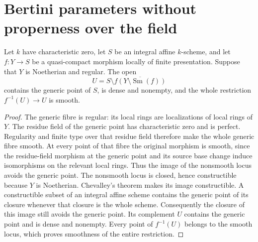 \section{Bertini parameters without properness over the field}
\label{sec:kn-relative-nadel-bertini}

\begin{lemma}
\label{lem:kn-relative-nadel-bertini-good-open}
\leanok
{}
Let $k$ have characteristic zero, let $S$ be an integral affine $k$-scheme,
and let $f:Y\to S$ be a quasi-compact morphism locally of finite presentation.
Suppose that $Y$ is Noetherian and regular.  The open
\[
 U=S\setminus\overline{f(Y\setminus\operatorname{Sm}(f))}
\]
contains the generic point of $S$, is dense and nonempty, and the whole
restriction $f^{-1}(U)\to U$ is smooth.
\end{lemma}
\begin{proof}
The generic fibre is regular: its local rings are localizations of local
rings of $Y$.  The residue field of the generic point has characteristic
zero and is perfect.  Regularity and finite type over that residue field
therefore make the whole generic fibre smooth.  At every point of that
fibre the original morphism is smooth, since the residue-field morphism
at the generic point and its source base change induce isomorphisms on
the relevant local rings.  Thus the image of the nonsmooth locus avoids
the generic point.  The nonsmooth locus is closed, hence constructible
because $Y$ is Noetherian.  Chevalley's theorem makes its image
constructible.  A constructible subset of an integral affine scheme
contains the generic point of its closure whenever that closure is the
whole scheme.  Consequently the closure of this image still avoids the
generic point.  Its complement $U$ contains the generic point and is
dense and nonempty.  Every point of $f^{-1}(U)$ belongs to the smooth
locus, which proves smoothness of the entire restriction.
\end{proof}

